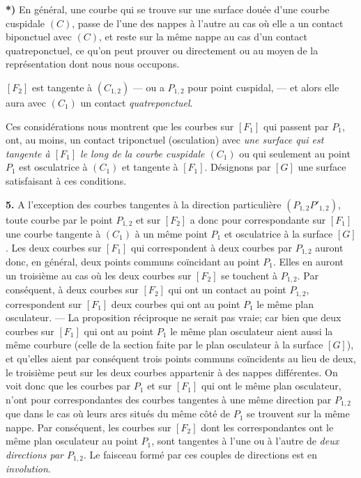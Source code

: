 \documentclass{article}
\begin{document}
\textbf{*)} En général, une courbe qui se trouve sur une surface douée d'une courbe cuspidale $(C)$, passe de l'une des nappes à l'autre au cas où elle a un contact biponctuel avec $(C)$, et reste sur la même nappe au cas d'un contact quatreponctuel, ce qu'on peut prouver ou directement ou au moyen de la représentation dont nous nous occupons.

$[F_2]$ est tangente à $(C_{1, 2})$ --- ou a $P_{1, 2}$ pour point cuspidal, --- et alors elle aura avec $(C_1)$ un contact \emph{quatreponctuel}.

Ces considérations nous montrent que les courbes sur $[F_1]$ qui passent par $P_1$, ont, au moins, un contact triponctuel (osculation) avec \emph{une surface qui est tangente à $[F_1]$ le long de la courbe cuspidale $(C_1)$} ou qui seulement au point $P_1$ est osculatrice à $(C_1)$ et tangente à $[F_1]$. Désignons par $[G]$ une surface satisfaisant à ces conditions.

\textbf{5.} A l'exception des courbes tangentes à la direction particulière $(P_{1, 2} P'_{1, 2})$, toute courbe par le point $P_{1, 2}$ et sur $[F_2]$ a donc pour correspondante sur $[F_1]$ une courbe tangente à $(C_1)$ à un même point $P_1$ et osculatrice à la surface $[G]$. Les deux courbes sur $[F_1]$ qui correspondent à deux courbes par $P_{1, 2}$ auront donc, en général, deux points communs coïncidant au point $P_1$. Elles en auront un troisième au cas où les deux courbes sur $[F_2]$ se touchent à $P_{1, 2}$. Par conséquent, à deux courbes sur $[F_2]$ qui ont un contact au point $P_{1, 2}$, correspondent sur $[F_1]$ deux courbes qui ont au point $P_1$ le même plan osculateur. --- La proposition réciproque ne serait pas vraie; car bien que deux courbes sur $[F_1]$ qui ont au point $P_1$ le même plan osculateur aient aussi la même courbure (celle de la section faite par le plan osculateur à la surface $[G]$), et qu'elles aient par conséquent trois points communs coïncidents au lieu de deux, le troisième peut sur les deux courbes appartenir à des nappes différentes. On voit donc que les courbes par $P_1$ et sur $[F_1]$ qui ont le même plan osculateur, n'ont pour correspondantes des courbes tangentes à une même direction par $P_{1, 2}$ que dans le cas où leurs arcs situés du même côté de $P_1$ se trouvent sur la même nappe. Par conséquent, les courbes sur $[F_2]$ dont les correspondantes ont le même plan osculateur au point $P_1$, sont tangentes à l'une ou à l'autre de \emph{deux directions par $P_{1, 2}$}. Le faisceau formé par ces couples de directions est en \emph{involution}.
\end{document}
